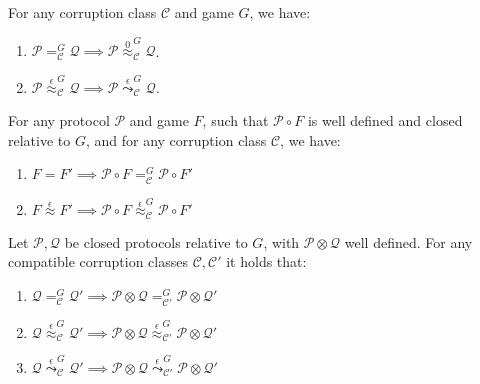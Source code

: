 \begin{theorem}
  For any corruption class $\mathcal{C}$ and game $G$, we have:
\begin{enumerate}
\item $\mathcal{P} =^G_{\mathcal{C}} \mathcal{Q} \implies \mathcal{P} \overset{0}{\approx}^G_\mathcal{C} \mathcal{Q}$.
\item $\mathcal{P} \overset{\epsilon}{\approx}^G_{\mathcal{C}} \mathcal{Q} \implies \mathcal{P} \overset{\epsilon}{\leadsto}^G_\mathcal{C} \mathcal{Q}$.
\end{enumerate}
\end{theorem}

\begin{theorem}
  For any protocol $\mathcal{P}$ and game $F$, such that $\mathcal{P} \circ F$
  is well defined and closed relative to $G$, and for any corruption class $\mathcal{C}$, we have:
  \begin{enumerate}
    \item $F = F' \implies \mathcal{P} \circ F =^G_{\mathcal{C}} \mathcal{P} \circ F'$
    \item $F \overset{\epsilon}{\approx} F' \implies \mathcal{P} \circ F \overset{\epsilon}{\approx}^G_{\mathcal{C}} \mathcal{P} \circ F'$
  \end{enumerate}
\end{theorem}

\begin{theorem}
  Let $\mathcal{P}, \mathcal{Q}$ be closed protocols relative to $G$, with $\mathcal{P} \otimes \mathcal{Q}$
  well defined. For any compatible corruption classes $\mathcal{C}, \mathcal{C}'$
  it holds that:
  \begin{enumerate}
    \item $\mathcal{Q} =^G_{\mathcal{C}} \mathcal{Q}' \implies \mathcal{P} \otimes \mathcal{Q} =^G_{\mathcal{C}'} \mathcal{P} \otimes \mathcal{Q}'$
    \item $\mathcal{Q} \overset{\epsilon}{\approx}^G_{\mathcal{C}} \mathcal{Q}' \implies \mathcal{P} \otimes \mathcal{Q} \overset{\epsilon}{\approx}^G_{\mathcal{C}'} \mathcal{P} \otimes \mathcal{Q}'$
    \item $\mathcal{Q} \overset{\epsilon}{\leadsto}^G_{\mathcal{C}} \mathcal{Q}' \implies \mathcal{P} \otimes \mathcal{Q} \overset{\epsilon}{\leadsto}^G_{\mathcal{C}'} \mathcal{P} \otimes \mathcal{Q}'$
  \end{enumerate}
\end{theorem}

